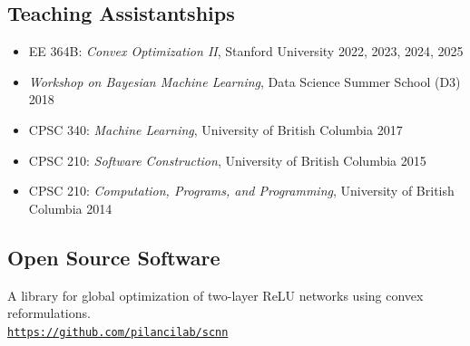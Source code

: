 \vspace{2ex}

\subsection{Teaching Assistantships}

\begin{itemize}[leftmargin=0pt,label={}]%
    \item EE 364B: {\it Convex Optimization II},
          Stanford University
          \hfill {} 2022, 2023, 2024, 2025

    \item \emph{Workshop on Bayesian Machine Learning}, Data Science Summer School (D3)
          \hfill  2018

    \item CPSC 340: {\it Machine Learning},
          University of British Columbia 
          \hfill {}2017

    \item CPSC 210: {\it Software Construction},
          University of British Columbia
          \hfill {}2015

    \item CPSC 210: {\it Computation, Programs, and Programming},
          University of British Columbia
          \hfill {}2014
\end{itemize}

\vspace{1ex}

\subsection{Open Source Software}
\begin{description}[leftmargin=6.5em,style=nextline,font=\normalfont\space]
    \item[SCNN] 
          A library for global optimization of two-layer ReLU networks using
          convex reformulations.
          \\
          \texttt{\url{https://github.com/pilancilab/scnn}}
\end{description}
